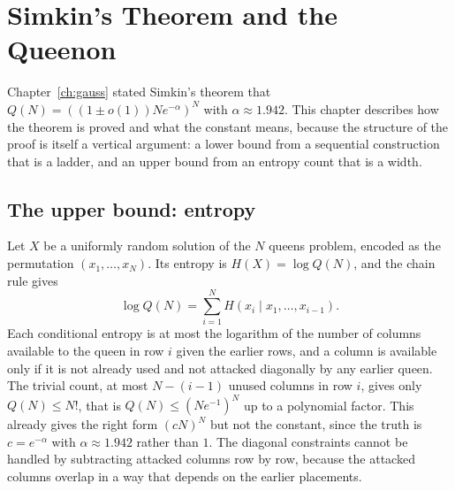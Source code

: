 \chapter{Simkin's Theorem and the Queenon}
\label{ch:simkin}

Chapter~\ref{ch:gauss} stated Simkin's theorem that $Q(N) = ((1 \pm o(1)) N e^{-\alpha})^N$ with $\alpha \approx 1.942$. This chapter describes how the theorem is proved and what the constant means, because the structure of the proof is itself a vertical argument: a lower bound from a sequential construction that is a ladder, and an upper bound from an entropy count that is a width.

\section{The upper bound: entropy}

Let $X$ be a uniformly random solution of the $N$ queens problem, encoded as the permutation $(x_1, \dots, x_N)$. Its entropy is $H(X) = \log Q(N)$, and the chain rule gives
\[
\log Q(N) = \sum_{i=1}^{N} H(x_i \mid x_1, \dots, x_{i-1}) .
\]
Each conditional entropy is at most the logarithm of the number of columns available to the queen in row $i$ given the earlier rows, and a column is available only if it is not already used and not attacked diagonally by any earlier queen. The trivial count, at most $N - (i-1)$ unused columns in row $i$, gives only $Q(N) \le N!$, that is $Q(N) \le (N e^{-1})^N$ up to a polynomial factor. This already gives the right form $(cN)^N$ but not the constant, since the truth is $c = e^{-\alpha}$ with $\alpha \approx 1.942$ rather than $1$. The diagonal constraints cannot be handled by subtracting attacked columns row by row, because the attacked columns overlap in a way that depends on the earlier placements.

